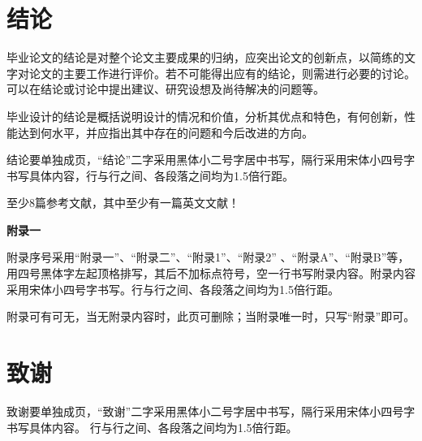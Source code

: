 \documentclass{sicnuthesis}
\begin{document}
\section{结论}

毕业论文的结论是对整个论文主要成果的归纳，应突出论文的创新点，以简练的文字对论文的主要工作进行评价。若不可能得出应有的结论，则需进行必要的讨论。可以在结论或讨论中提出建议、研究设想及尚待解决的问题等。

毕业设计的结论是概括说明设计的情况和价值，分析其优点和特色，有何创新，性能达到何水平，并应指出其中存在的问题和今后改进的方向。

结论要单独成页，“结论”二字采用黑体小二号字居中书写，隔行采用宋体小四号字书写具体内容，行与行之间、各段落之间均为1.5倍行距。

\newpage

%
%

至少8篇参考文献，其中至少有一篇英文文献！

\newpage

\appendix


{\bf 附录一}

\vspace{1cm}

附录序号采用“附录一”、“附录二”、“附录1”、“附录2” 、“附录A”、“附录B”等，用四号黑体字左起顶格排写，其后不加标点符号，空一行书写附录内容。附录内容采用宋体小四号字书写。行与行之间、各段落之间均为1.5倍行距。

附录可有可无，当无附录内容时，此页可删除；当附录唯一时，只写“附录”即可。


\newpage

\section*{致谢}


致谢要单独成页，“致谢”二字采用黑体小二号字居中书写，隔行采用宋体小四号字书写具体内容。
行与行之间、各段落之间均为1.5倍行距。
\end{document}
